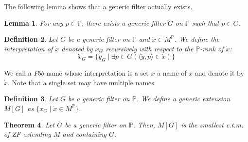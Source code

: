 \documentclass{report}
\newtheorem{thm}{Theorem}[chapter]
\newtheorem{lem}[thm]{Lemma}
\newtheorem{dfn}[thm]{Definition}
\newcommand{\Pbb}{\mathbb{P}}
\begin{document}
The following lemma shows that a generic filter actually exists.
\begin{lem} 
  For any $p \in \Pbb$, there exists a generic filter $G$ on $\Pbb$ such that $p \in G$.
\end{lem}

\begin{dfn} 
  Let $G$ be a generic filter on $\Pbb$ and $\dot{x} \in M^{\Pbb}$. We define the \emph{interpretation} of $\dot{x}$ denoted by $\dot{x}_G$ recursively with respect to the $\Pbb$-rank of $\dot{x}$:
  $$\dot{x}_G = \{\dot{y}_G \mid \exists p \in G (\langle \dot{y}, p \rangle \in \dot{x})\}$$ 
\end{dfn}

We call a $Pbb$-name whose interpretation is a set $x$ a name of $x$ and denote it by $\dot{x}$.
Note that a single set may have multiple names.

\begin{dfn} 
  Let $G$ be a generic filter on $\Pbb$. We define a \emph{generic extension} $M[G]$ as $\{x_G \mid \dot{x} \in M^{\Pbb}\}$.
\end{dfn}

\begin{thm} 
  Let $G$ be a generic filter on $\Pbb$. Then, $M[G]$ is the smallest c.t.m. of ZF extending $M$ and containing $G$.
\end{thm}
\end{document}
